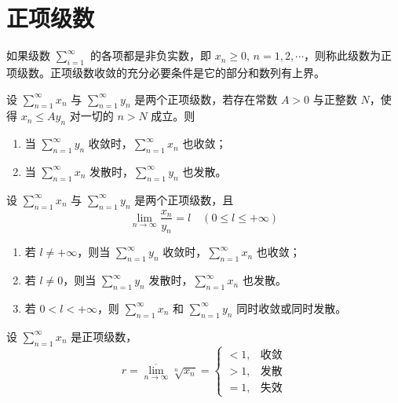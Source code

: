 \documentclass{ctexbook}
\begin{document}
\section{正项级数}

\begin{theorem}[正项级数的收敛原理]
    如果级数 $\sum_{i=1}^\infty$ 的各项都是非负实数，即 \underline{$x_n\geq 0$}, $n=1,2,\cdots$，则称此级数为正项级数。正项级数收敛的充分必要条件是它的部分和数列有上界。
\end{theorem}

\begin{theorem}[比较判别法]
    设 $\sum_{n=1}^\infty x_n$ 与 $\sum_{n=1}^\infty y_n$ 是两个正项级数，若存在常数 $A>0$ 与正整数 $N$，使得 $x_n\leq Ay_n$ 对一切的 $n>N$ 成立。则
    \begin{enumerate}
        \item 当 $\sum_{n=1}^\infty y_n$ 收敛时，$\sum_{n=1}^\infty x_n$ 也收敛；
        \item 当 $\sum_{n=1}^\infty x_n$ 发散时，$\sum_{n=1}^\infty y_n$ 也发散。
    \end{enumerate}
\end{theorem}

\begin{theorem}[比较判别法的极限形式]
    设 $\sum_{n=1}^\infty x_n$ 与 $\sum_{n=1}^\infty y_n$ 是两个正项级数，且
    \begin{equation}
        \lim_{n\rightarrow\infty}\frac{x_n}{y_n}=l\quad (0\leq l\leq +\infty)
    \end{equation}
    \begin{enumerate}
        \item 若 $l\neq+\infty$，则当 $\sum_{n=1}^\infty y_n$ 收敛时，$\sum_{n=1}^\infty x_n$ 也收敛；
        \item 若 $l\neq 0$，则当 $\sum_{n=1}^\infty y_n$ 发散时，$\sum_{n=1}^\infty x_n$ 也发散。
        \item 若 $0<l<+\infty$，则 $\sum_{n=1}^\infty x_n$ 和 $\sum_{n=1}^\infty y_n$ 同时收敛或同时发散。
    \end{enumerate}
\end{theorem}

\begin{theorem}
    设 $\sum_{n=1}^\infty x_n$ 是正项级数，
    \begin{equation}
        r=\overline{\lim_{n\rightarrow\infty}}\sqrt[n]{x_n}=\begin{cases}
        <1, & \text{收敛}\\
        >1, & \text{发散}\\
        =1, & \text{失效}
        \end{cases}
    \end{equation}
\end{theorem}
\end{document}
